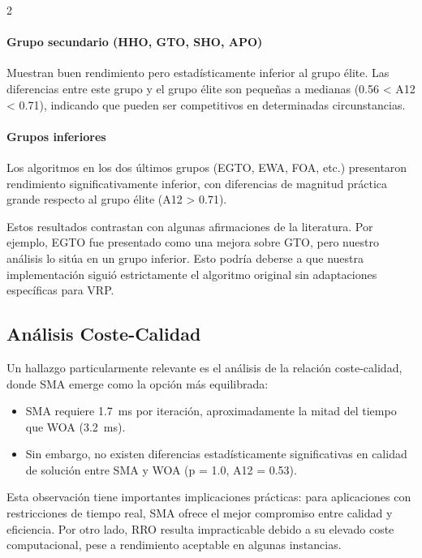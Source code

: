 \documentclass[10pt,a4paper]{extarticle}
\begin{document}
{\begin{multicols}{2}
\paragraph{Grupo secundario (HHO, GTO, SHO, APO)} Muestran buen rendimiento pero estadísticamente inferior al grupo élite. Las diferencias entre este grupo y el grupo élite son pequeñas a medianas (0.56 < A12 < 0.71), indicando que pueden ser competitivos en determinadas circunstancias.

\paragraph{Grupos inferiores} Los algoritmos en los dos últimos grupos (EGTO, EWA, FOA, etc.) presentaron rendimiento significativamente inferior, con diferencias de magnitud práctica grande respecto al grupo élite (A12 > 0.71).

Estos resultados contrastan con algunas afirmaciones de la literatura. Por ejemplo, EGTO \cite{Hassan2024EGTO} fue presentado como una mejora sobre GTO, pero nuestro análisis lo sitúa en un grupo inferior. Esto podría deberse a que nuestra implementación siguió estrictamente el algoritmo original sin adaptaciones específicas para VRP.

\subsection{Análisis Coste-Calidad}
Un hallazgo particularmente relevante es el análisis de la relación coste-calidad, donde SMA emerge como la opción más equilibrada:
\begin{itemize}
\item SMA requiere \SI{1.7}{\milli\second} por iteración, aproximadamente la mitad del tiempo que WOA (\SI{3.2}{\milli\second}).
\item Sin embargo, no existen diferencias estadísticamente significativas en calidad de solución entre SMA y WOA (p = 1.0, A12 = 0.53).
\end{itemize}

Esta observación tiene importantes implicaciones prácticas: para aplicaciones con restricciones de tiempo real, SMA ofrece el mejor compromiso entre calidad y eficiencia. Por otro lado, RRO resulta impracticable debido a su elevado coste computacional, pese a rendimiento aceptable en algunas instancias.


\end{multicols}}
\end{document}
